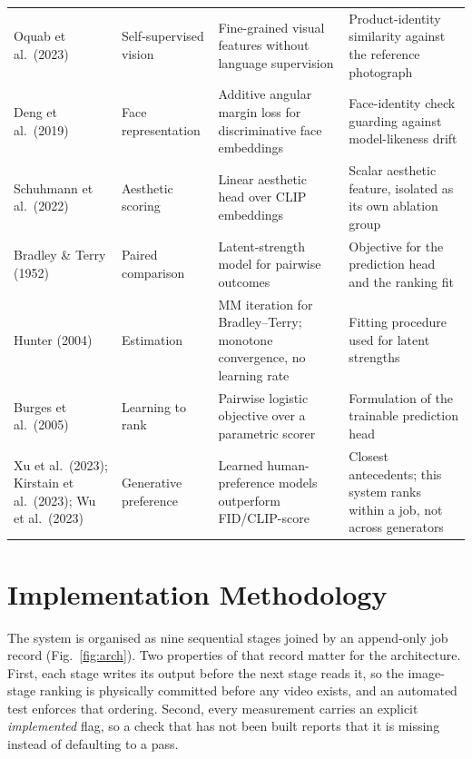 \documentclass[conference]{IEEEtran}
\begin{document}
\begin{table}[t]
\begin{tabular}{@{}p{2.7cm}p{2.3cm}p{5.0cm}p{5.4cm}@{}}
Oquab et al.\ (2023) \cite{oquab2023dinov2} & Self-supervised vision & Fine-grained visual features without language supervision & Product-identity similarity against the reference photograph \\
Deng et al.\ (2019) \cite{deng2019arcface} & Face representation & Additive angular margin loss for discriminative face embeddings & Face-identity check guarding against model-likeness drift \\
Schuhmann et al.\ (2022) \cite{schuhmann2022laion} & Aesthetic scoring & Linear aesthetic head over CLIP embeddings & Scalar aesthetic feature, isolated as its own ablation group \\
Bradley \& Terry (1952) \cite{bradley1952} & Paired comparison & Latent-strength model for pairwise outcomes & Objective for the prediction head and the ranking fit \\
Hunter (2004) \cite{hunter2004mm} & Estimation & MM iteration for Bradley--Terry; monotone convergence, no learning rate & Fitting procedure used for latent strengths \\
Burges et al.\ (2005) \cite{burges2005ranknet} & Learning to rank & Pairwise logistic objective over a parametric scorer & Formulation of the trainable prediction head \\
Xu et al.\ (2023); Kirstain et al.\ (2023); Wu et al.\ (2023) \cite{xu2023imagereward,kirstain2023pickapic,wu2023hps} & Generative preference & Learned human-preference models outperform FID/CLIP-score & Closest antecedents; this system ranks within a job, not across generators \\
\bottomrule
\end{tabular}
\end{table}

\section{Implementation Methodology}
\label{sec:method}

The system is organised as nine sequential stages joined by an append-only job
record (Fig.~\ref{fig:arch}). Two properties of that record matter for the
architecture. First, each stage writes its output before the next stage reads it, so
the image-stage ranking is physically committed before any video exists, and an
automated test enforces that ordering. Second, every measurement carries an explicit
\emph{implemented} flag, so a check that has not been built reports that it is
missing instead of defaulting to a pass.
\end{document}
